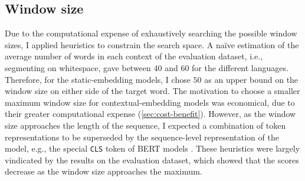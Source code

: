 \subsection{Window size} \label{sec:window-size}

Due to the computational expense of exhaustively searching the possible window sizes, I
applied heuristics to constrain the search space.
A naïve estimation of the average number of words in each context of the evaluation
dataset, i.e., segmenting on whitespace, gave between $40$ and $60$ for the different
languages.
Therefore, for the static-embedding models, I chose $50$ as an upper bound on the
window size on either side of the target word.
The motivation to choose a smaller maximum window size for contextual-embedding models
was economical, due to their greater computational expense (\cref{sec:cost-benefit}).
However, as the window size approaches the length of the sequence, I expected a
combination of token representations to be superseded by the sequence-level
representation of the model, e.g., the special \texttt{CLS} token of BERT models
\parencite[4174]{Devlin2019}.
These heuristics were largely vindicated by the results on the evaluation dataset,
which showed that the scores decrease as the window size approaches the maximum.
